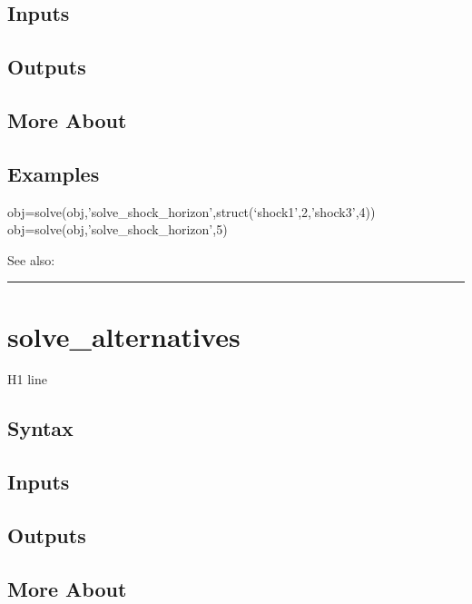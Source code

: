 \documentclass[letterpaper,10pt,english]{sphinxmanual}
\begin{document}
\subsection{Inputs}
\label{classes/models/@dsge/dsge:id190}

\subsection{Outputs}
\label{classes/models/@dsge/dsge:id191}

\subsection{More About}
\label{classes/models/@dsge/dsge:id192}

\subsection{Examples}
\label{classes/models/@dsge/dsge:id193}
obj=solve(obj,'solve\_shock\_horizon',struct(`shock1',2,'shock3',4))
obj=solve(obj,'solve\_shock\_horizon',5)

See also:


\bigskip\hrule{}\bigskip



\section{solve\_alternatives}
\label{classes/models/@dsge/dsge:solve-alternatives}\label{classes/models/@dsge/dsge:id194}
H1 line


\subsection{Syntax}
\label{classes/models/@dsge/dsge:id195}

\subsection{Inputs}
\label{classes/models/@dsge/dsge:id196}

\subsection{Outputs}
\label{classes/models/@dsge/dsge:id197}

\subsection{More About}
\label{classes/models/@dsge/dsge:id198}
\end{document}
